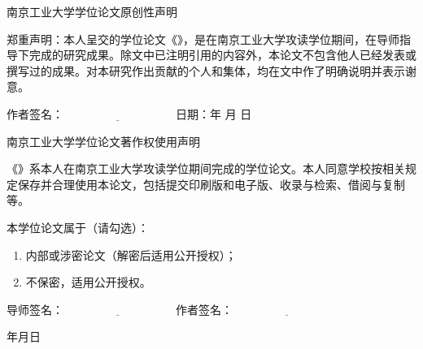 \thispagestyle{empty}
\vspace*{1em}
{
\linespread{1.4}
\centerline{\STSong 南京工业大学学位论文原创性声明}
\bigskip

郑重声明：本人呈交的学位论文《\cctitle》，是在南京工业大学攻读学位期间，在导师指导下完成的研究成果。除文中已注明引用的内容外，本论文不包含他人已经发表或撰写过的成果。对本研究作出贡献的个人和集体，均在文中作了明确说明并表示谢意。

\vspace{1em}
{\STSong 作者签名}：$\underline{\hspace{4cm}}$ \hfill
{\STSong 日\quad 期}：\qquad 年 \quad 月 \quad 日

\vspace{4em}
\centerline{\STSong 南京工业大学学位论文著作权使用声明}
\bigskip

《\cctitle》系本人在南京工业大学攻读学位期间完成的学位论文。本人同意学校按相关规定保存并合理使用本论文，包括提交印刷版和电子版、收录与检索、借阅与复制等。

\vspace{1em}
本学位论文属于（请勾选）：
\begin{enumerate}
  \item 内部或涉密论文（解密后适用公开授权）；
  \item 不保密，适用公开授权。
\end{enumerate}

\vspace{1em}
{\STSong 导师签名}：$\underline{\hspace{4cm}}$ \hfill
{\STSong 作者签名}：$\underline{\hspace{4cm}}$

\bigskip
{\mbox{}\hfill 年\qquad 月\qquad 日}
}
